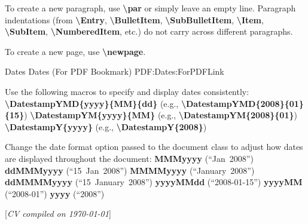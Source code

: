 \documentclass[letterpaper,MMMyyyy,nonstopmode]{simpleresumecv}
\newcommand{\CVNote}{CV compiled on {\today}}
\newcommand{\Code}[1]{\mbox{\textbf{#1}}}
\newcommand{\CodeCommand}[1]{\mbox{\textbf{\textbackslash{#1}}}}
\begin{document}
\begin{Body}
{\Gap
\BulletItem
To create a new paragraph, use \CodeCommand{par} or simply leave an empty line.
Paragraph indentations (from
\CodeCommand{Entry},
\CodeCommand{BulletItem},
\CodeCommand{SubBulletItem},
\CodeCommand{Item},
\CodeCommand{SubItem},
\CodeCommand{NumberedItem},
etc.) do not carry across different paragraphs.

\Gap
\BulletItem
To create a new page, use \CodeCommand{newpage}.

\BigGap
\SubSection
{Dates}
{Dates (For PDF Bookmark)}
{PDF:Dates:ForPDFLink}

\Gap
\BulletItem
Use the following macros to specify and display dates consistently:
\SubBulletItem
\CodeCommand{DatestampYMD\{yyyy\}\{MM\}\{dd\}}
(e.g., \CodeCommand{DatestampYMD\{2008\}\{01\}\{15\}})
\SubBulletItem
\CodeCommand{DatestampYM\{yyyy\}\{MM\}}
(e.g., \CodeCommand{DatestampYM\{2008\}\{01\}})
\SubBulletItem
\CodeCommand{DatestampY\{yyyy\}}
(e.g., \CodeCommand{DatestampY\{2008\}})

\Gap
\BulletItem
Change the date format option passed to the document class to adjust how dates are displayed throughout the document:
\SubBulletItem
\Code{MMMyyyy} (``Jan~2008'')
\SubBulletItem
\Code{ddMMMyyyy} (``15~Jan~2008'')
\SubBulletItem
\Code{MMMMyyyy} (``January~2008'')
\SubBulletItem
\Code{ddMMMMyyyy} (``15~January~2008'')
\SubBulletItem
\Code{yyyyMMdd} (``2008-01-15'')
\SubBulletItem
\Code{yyyyMM} (``2008-01'')
\SubBulletItem
\Code{yyyy} (``2008'')

\endgroup

\fi

\end{Body}


\UseNoteFont%
\null\hfill%
[\textit{\CVNote}]
\end{document}
